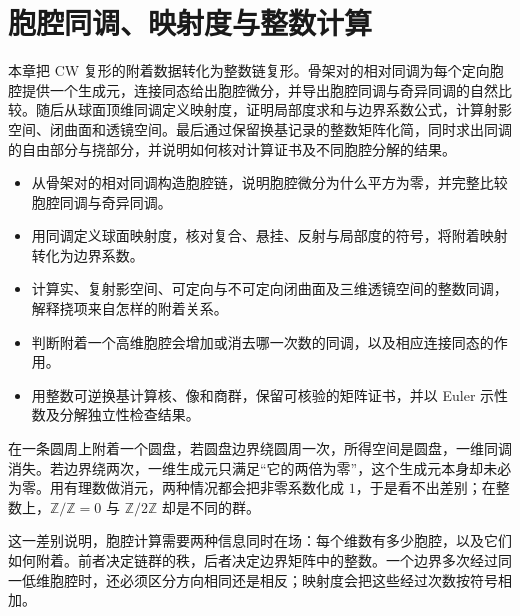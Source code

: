 
% 
% 

\chapter{胞腔同调、映射度与整数计算}
\label{g2:ch:03}

\begin{chapterabstract}
	本章把 CW 复形的附着数据转化为整数链复形。骨架对的相对同调为每个定向胞腔提供一个生成元，连接同态给出胞腔微分，并导出胞腔同调与奇异同调的自然比较。随后从球面顶维同调定义映射度，证明局部度求和与边界系数公式，计算射影空间、闭曲面和透镜空间。最后通过保留换基记录的整数矩阵化简，同时求出同调的自由部分与挠部分，并说明如何核对计算证书及不同胞腔分解的结果。
\end{chapterabstract}

\begin{learninggoals}
	\begin{itemize}
		\item 从骨架对的相对同调构造胞腔链，说明胞腔微分为什么平方为零，并完整比较胞腔同调与奇异同调。
		\item 用同调定义球面映射度，核对复合、悬挂、反射与局部度的符号，将附着映射转化为边界系数。
		\item 计算实、复射影空间、可定向与不可定向闭曲面及三维透镜空间的整数同调，解释挠项来自怎样的附着关系。
		\item 判断附着一个高维胞腔会增加或消去哪一次数的同调，以及相应连接同态的作用。
		\item 用整数可逆换基计算核、像和商群，保留可核验的矩阵证书，并以 Euler 示性数及分解独立性检查结果。
	\end{itemize}
\end{learninggoals}

在一条圆周上附着一个圆盘，若圆盘边界绕圆周一次，所得空间是圆盘，一维同调消失。若边界绕两次，一维生成元只满足“它的两倍为零”，这个生成元本身却未必为零。用有理数做消元，两种情况都会把非零系数化成 \(1\)，于是看不出差别；在整数上，\(\mathbb Z/\mathbb Z=0\) 与 \(\mathbb Z/2\mathbb Z\) 却是不同的群。

\ProseParagraphBreak

这一差别说明，胞腔计算需要两种信息同时在场：每个维数有多少胞腔，以及它们如何附着。前者决定链群的秩，后者决定边界矩阵中的整数。一个边界多次经过同一低维胞腔时，还必须区分方向相同还是相反；映射度会把这些经过次数按符号相加。

